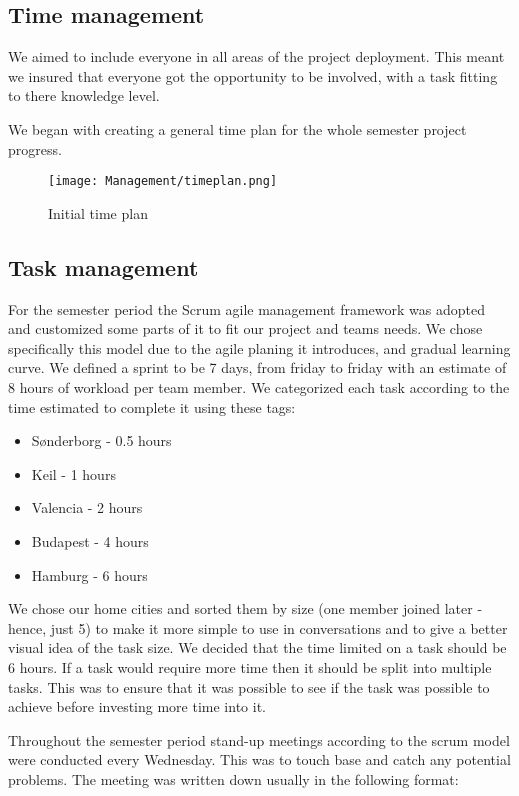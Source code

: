 \documentclass[../report.tex]{subfiles}
\begin{document}
\subsection{Time management}
We aimed to include everyone in all areas of the project deployment. This meant
we insured that everyone got the opportunity to be involved, with a task
fitting to there knowledge level.

We began with creating a general time plan for the whole semester project
progress.
\begin{figure}[H]
    \texttt{[image: Management/timeplan.png]}
    \caption{Initial time plan}
\end{figure}

\subsection{Task management}

For the semester period the Scrum agile management framework was adopted and customized some parts of it to fit our project
and teams needs. We chose specifically this model due to the agile planing it introduces, and gradual
learning curve. We defined a sprint to be 7 days, from friday to friday with an estimate of 8 hours of
workload per team member. We categorized each task according to the time estimated to complete it
using these tags:

\begin{itemize}
    \item Sønderborg - 0.5 hours
    \item Keil - 1 hours
    \item Valencia - 2 hours
    \item Budapest - 4 hours
    \item Hamburg -  6 hours
\end{itemize}

We chose our home cities and sorted them by size (one member joined later - hence, just 5) to make it more simple to use
in conversations and to give a better visual idea of the task size. We decided
that the time limited on a task should be 6 hours. If a task would require more
time then it should be split into multiple tasks. This was to ensure that it
was possible to see if the task was possible to achieve before investing more
time into it.

Throughout the semester period stand-up meetings according to the scrum model
were conducted every Wednesday. This was to touch base and catch any potential
problems. The meeting was written down usually in the following format:
\end{document}
